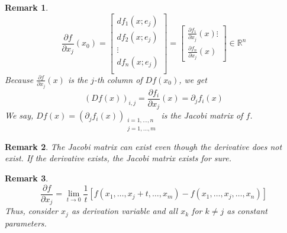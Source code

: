 \documentclass{article}
\newtheorem{remark}{Remark}  \numberwithin{remark}{section}
\begin{document}
\begin{remark}
  \[
    \frac{\partial f}{\partial x_j}(x_0) =
    \begin{bmatrix}
      df_1(x; e_j) \\
      df_2(x; e_j) \\
      \vdots \\
      df_n(x; e_j) \\
    \end{bmatrix}
    = \begin{bmatrix}
      \frac{\partial f_1}{\partial x_j}(x)
      \vdots \\
      \frac{\partial f_n}{\partial x_j}(x)
    \end{bmatrix}
    \in \mathbb R^n
  \]
  Because $\frac{\partial f}{\partial x_j}(x)$ is the $j$-th column of $Df(x_0)$,
  we get
  \[ \left(Df(x)\right)_{i,j} = \frac{\partial f_i}{\partial x_j}(x) = \partial_j f_i(x) \]
  We say, $Df(x) = (\partial_j f_i(x))_{\substack{i = 1,\dots,n \\ j = 1,\dots,m}}$ is the \emph{Jacobi matrix} of $f$.
\end{remark}

\begin{remark}
  The Jacobi matrix can exist even though the derivative does not exist.
  If the derivative exists, the Jacobi matrix exists for sure.
\end{remark}

\begin{remark}
  \[ \frac{\partial f}{\partial x_j} = \lim_{t\to0} \frac1t \left[f(x_1, \dots, x_j+t, \dots, x_m) - f(x_1, \dots, x_j, \dots, x_n)\right] \]
  Thus, consider $x_j$ as derivation variable and all $x_k$ for $k \neq j$ as constant parameters.
\end{remark}
\end{document}
